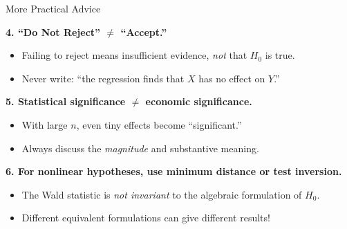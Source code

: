 \documentclass[handout, aspectratio=169]{beamer}
\numberwithin{equation}{section}
\begin{document}
\begin{frame}{More Practical Advice}

\textbf{4. ``Do Not Reject'' $\neq$ ``Accept.''}
\begin{itemize}
\item Failing to reject means insufficient evidence, \emph{not} that $H_0$ is true.
\item Never write: ``the regression finds that $X$ has no effect on $Y$.''
\end{itemize}

\pause
\smallskip

\textbf{5. Statistical significance $\neq$ economic significance.}
\begin{itemize}
\item With large $n$, even tiny effects become ``significant.''
\item Always discuss the \emph{magnitude} and substantive meaning.
\end{itemize}

\pause
\smallskip

\textbf{6. For nonlinear hypotheses, use minimum distance or test inversion.}
\begin{itemize}
\item The Wald statistic is \emph{not invariant} to the algebraic formulation of $H_0$.
\item Different equivalent formulations can give different results!
\end{itemize}
\end{frame}
\end{document}
